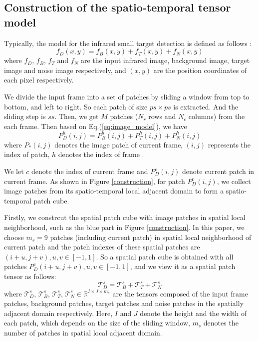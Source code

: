 \documentclass[journal]{IEEEtran}
\begin{document}
\subsection{Construction of the spatio-temporal tensor model}

Typically, the model for the infrared small target detection is defined as follows \cite{gu2010kernel}:
\begin{equation}
  f_D(x,y)=f_B(x,y)+f_T(x,y)+f_N(x,y)
  \label{eq:image_model}
\end{equation}
where $f_D$, $f_B$, $f_T$ and $f_N$ are the input infrared image, background image, target image and noise image respectively, and $(x,y)$ are the position coordinates of each pixel respectively. 
 
We divide the input frame into a set of patches by sliding a window from top to bottom, and left to right. So each patch of size $ps \times ps$ is extracted. And the sliding step is $ss$. Then, we get $M$ patches ($N_r$ rows and $N_c$ columns)  from the each frame. Then based on Eq.(\ref{eq:image_model}), we have
\begin{equation}
  P_D^h(i,j)=P_B^h(i,j)+P_T^h(i,j)+P_N^h(i,j)
  \label{eq:patch_model}
\end{equation}
where $P_*(i,j)$ denotes the image patch of current frame, $(i,j)$ represents the index of patch, $h$ denotes the index of frame .

We let $c$ denote the index of current frame and $P_D^c(i,j)$ denote current patch in current frame. As shown in Figure \ref{construction}, for patch $P_D^c(i,j)$, we collect image patches from its spatio-temporal local adjacent domain to form a spatio-temporal patch cube. 

Firstly, we constrcut the spatial patch cube with image patches in spatial local neighborhood, such as the blue part in Figure \ref{construction}. In this paper, we choose $m_s=9$ patches (including current patch) in spatial local neighborhood of current patch and the patch indexes of these spatial patches are $(i+u,j+v),u,v \in [-1,1]$. So a spatial patch cube is obtained with all patches $P_D^{c}(i+u,j+v),u,v \in [-1,1]$, and we view it as a spatial patch tensor as follows:
\begin{equation}
  \bm{\mathcal T}_D^s = \bm{\mathcal T}_B^s + \bm{\mathcal T}_T^s + \bm{\mathcal T}_N^s
  \label{eq:spatial_tensor_model}
\end{equation}
where $\bm{\mathcal T}_D^s$, $\bm{\mathcal T}_B^s$, $\bm{\mathcal T}_T^s$, $\bm{\mathcal T}_N^s \in {\mathbb R}^{{I}\times{J}\times{m_s}}$ are the tensors composed of the input frame patches, background patches, target patches and noise patches in the spatially adjacent domain respectively. Here, $I$ and $J$ denote the height and the width of each patch, which depends on the size of the sliding window, $m_s$ denotes the number of patches in spatial local adjacent domain.
\end{document}
